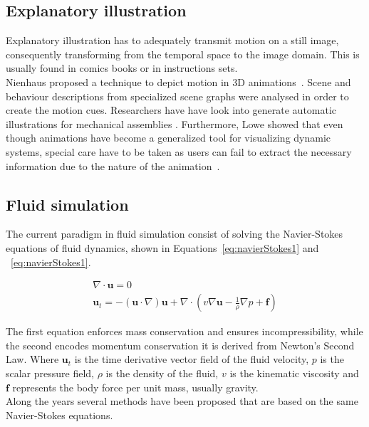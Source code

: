 \subsection{Explanatory illustration}

Explanatory illustration has to adequately transmit motion on a still image, consequently transforming from the temporal space to the image domain.
This is usually found in comics books or in instructions sets.\\

Nienhaus proposed a technique to depict motion in 3D animations~\cite{Nienhaus2005}.
Scene and behaviour descriptions from specialized scene graphs were analysed in order to create the motion cues.  
Researchers have have look into generate automatic illustrations for mechanical assemblies \cite{Mitra2010}.
Furthermore, Lowe showed that even though animations have become a generalized tool for visualizing dynamic systems, special care have to be taken as users can fail to extract the necessary information due to the nature of the animation~\cite{Lowe2014}.


\subsection{Fluid simulation}
\label{prevWorkFluidSim}

The current paradigm in fluid simulation consist of solving the Navier-Stokes equations of fluid dynamics, shown in Equations~\ref{eq:navierStokes1} and  ~\ref{eq:navierStokes1}.

\begin{gather}
\label{eq:navierStokes1}
\nabla \cdot \mathbf{u} = 0\\
\label{eq:navierStokes2}
\mathbf{u}_t = -(\mathbf{u} \cdot \nabla)\mathbf{u} + \nabla \cdot ( v \nabla \mathbf{u} - \frac{1}{\rho} \nabla p + \mathbf{f} )
\end{gather}

The first equation enforces mass conservation and ensures incompressibility, while the second encodes momentum conservation it is derived from Newton's Second Law.
Where $\mathbf{u}_t$ is the time derivative vector field of the fluid velocity, $p$  is the scalar pressure field, $\rho$ is the density of the fluid, $v$ is the kinematic viscosity and $\mathbf{f}$ represents the body force per unit mass, usually gravity.\\

Along the years several methods have been proposed that are based on the same Navier-Stokes equations.

